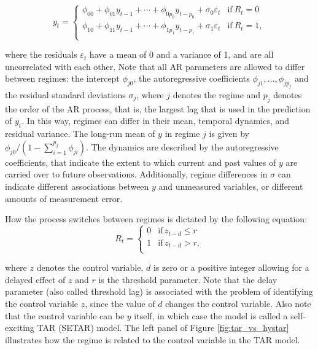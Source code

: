 \documentclass{article}
\begin{document}
\begin{equation}
y_t = 
\begin{cases}
\phi_{00} + \phi_{01} y_{t-1} + \cdots + \phi_{0 p_0} y_{t-p_0} + \sigma_{0} \varepsilon_t & \text{if}~R_{t} = 0\\
\phi_{10} + \phi_{11} y_{t-1} + \cdots + \phi_{1 p_1} y_{t-p_1} + \sigma_{1} \varepsilon_t & \text{if}~R_{t} = 1, \\
\end{cases}
\label{eqn:ar_processes}
\end{equation}

where the residuals $\varepsilon_t$ have a mean of 0 and a variance of 1, and are all uncorrelated with each other.
Note that all AR parameters are allowed to differ between regimes: the intercept $\phi_{j0}$, the autoregressive coefficients $\phi_{j1}, \dots, \phi_{j p_j}$ and the residual standard deviations $\sigma_j$, where $j$ denotes the regime and $p_j$ denotes the order of the AR process, that is, the largest lag that is used in the prediction of $y_t$.
In this way, regimes can differ in their mean, temporal dynamics, and residual variance.
The long-run mean of $y$ in regime $j$ is given by $\phi_{j0}/(1 - \sum_{i=1}^{p_j} \phi_{ji})$. 
The dynamics are described by the autoregressive coefficients, that indicate the extent to which current and past values of $y$ are carried over to future observations.
Additionally, regime differences in $\sigma$ can indicate different associations between $y$ and unmeasured variables, or different amounts of measurement error.

How the process switches between regimes is dictated by the following equation:
\begin{equation} \label{eqn:simple_switching}
R_t = \begin{cases}
0 & \mathrm{if} \, z_{t-d} \le r \\
1 & \mathrm{if} \, z_{t-d} > r, \\
\end{cases}
\end{equation}

where $z$ denotes the control variable, $d$ is zero or a positive integer allowing for a delayed effect of $z$ and $r$ is the threshold parameter.
Note that the delay parameter (also called threshold lag) is associated with the problem of identifying the control variable $z$, since the value of $d$ changes the control variable.
Also note that the control variable can be $y$ itself, in which case the model is called a self-exciting TAR (SETAR) model.
The left panel of Figure \ref{fig:tar_vs_hystar} illustrates how the regime is related to the control variable in the TAR model.
\end{document}
